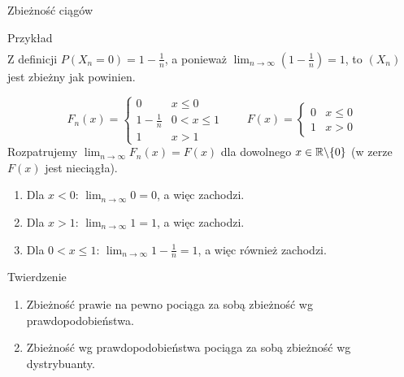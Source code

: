 \documentclass{mp}
\begin{document}
\begin{frame}{Zbieżność ciągów}
{\begin{block}{Przykład}
{\begin{gather*}
	\end{gather*}
	Z definicji $P(X_n=0)=1-\frac{1}{n}$, a ponieważ $\lim_{n\to\infty} \left(1-\frac{1}{n}\right)=1$, to $(X_n)$ jest zbieżny jak powinien.
}
{
	\[ F_n(x)=\begin{cases} 0 & x\leq 0 \\ 1-\frac{1}{n} & 0<x\leq 1 \\ 1 & x>1 \end{cases} \qquad F(x)=\begin{cases} 0 & x\leq 0 \\ 1 & x>0 \end{cases} \]
	Rozpatrujemy $\lim_{n\to\infty} F_n(x)=F(x)$ dla dowolnego $x\in\mathbb{R}\backslash\{0\}$ (w zerze $F(x)$ jest nieciągła).
	\begin{enumerate}
	\item Dla $x<0$: $\lim_{n\to\infty} 0=0$, a więc zachodzi.
	\item Dla $x>1$: $\lim_{n\to\infty} 1=1$, a więc zachodzi.
	\item Dla $0<x\leq 1$: $\lim_{n\to\infty} 1-\frac{1}{n}=1$, a więc również zachodzi.
	\end{enumerate}
}
\end{block}
}
{
	\begin{block}{Twierdzenie}
	\begin{enumerate}
	\item Zbieżność prawie na pewno pociąga za sobą zbieżność wg prawdopodobieństwa.
	\item Zbieżność wg prawdopodobieństwa pociąga za sobą zbieżność wg dystrybuanty.
	\end{enumerate}
	\end{block}
}
\end{frame}
\end{document}
